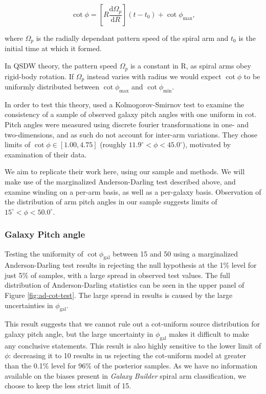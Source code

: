 \begin{equation}
  \label{eq:winding}
  \cot{\phi} = \left[R\frac{\mathrm{d}\Omega_p}{\mathrm{d}R}\right](t - t_0) + \cot{\phi_\mathrm{max}},
\end{equation}

where $\Omega_p$ is the radially dependant pattern speed of the spiral arm and $t_0$ is the initial time at which it formed.

In QSDW theory, the pattern speed $\Omega_p$ is a constant in R, as spiral arms obey rigid-body rotation. If $\Omega_p$ instead varies with radius we would expect $\cot{\phi}$ to be uniformly distributed between $\cot{\phi_\mathrm{max}}$ and $\cot{\phi_\mathrm{min}}$.

In order to test this theory, \citet{2019arXiv190910291P} used a Kolmogorov-Smirnov test to examine the consistency of a sample of observed galaxy pitch angles with one uniform in cot. Pitch angles were measured using discrete fourier transformations in one- and two-dimensions, and as such do not account for inter-arm variations. They chose limits of $\cot{\phi} \in [1.00, 4.75]$ (roughly $11.9^\circ < \phi < 45.0^\circ$), motivated by examination of their data.

We aim to replicate their work here, using our sample and methods. We will make use of the marginalized Anderson-Darling test described above, and examine winding on a per-arm basis, as well as a per-galaxy basis. Observation of the distribution of arm pitch angles in our sample suggests limits of $15^\circ < \phi < 50.0^\circ$.

\subsubsection{Galaxy Pitch angle}

Testing the uniformity of $\cot\phi_\mathrm{gal}$ between {15\degree} and {50\degree} using a marginalized Anderson-Darling test results in rejecting the null hypothesis at the 1\% level for just 5\% of samples, with a large spread in observed test values. The full distribution of Anderson-Darling statistics can be seen in the upper panel of Figure \ref{fig:ad-cot-test}. The large spread in results is caused by the large uncertainties in $\phi_\mathrm{gal}$.

This result suggests that we cannot rule out a cot-uniform source distribution for galaxy pitch angle, but the large uncertainty in $\phi_\mathrm{gal}$ makes it difficult to make any conclusive statements. This result is also highly sensitive to the lower limit of $\phi$: decreasing it to {10\degree} results in us rejecting the cot-uniform model at greater than the 0.1\% level for 96\% of the posterior samples. As we have no information available on the biases present in \textit{Galaxy Builder} spiral arm classification, we choose to keep the less strict limit of {15\degree}.

